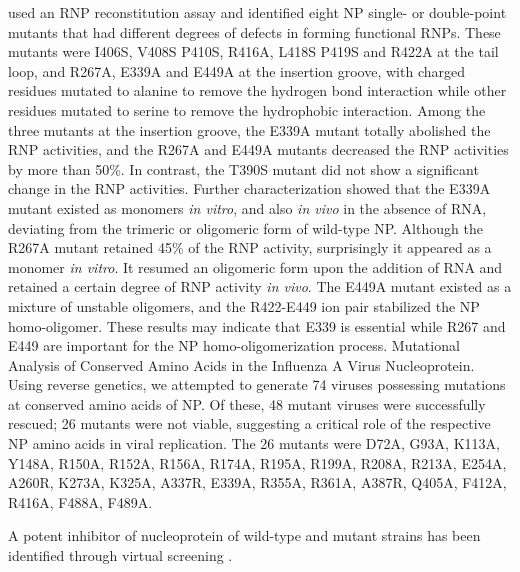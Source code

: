 \citep{1232} used an RNP reconstitution assay and identified eight NP single- or double-point mutants that had different degrees of defects in forming functional RNPs. These mutants were I406S, V408S P410S, R416A, L418S P419S and R422A at the tail loop, and R267A, E339A and E449A at the insertion groove, with charged residues mutated to alanine to remove the hydrogen bond interaction while other residues mutated to serine to remove the hydrophobic interaction. Among the three mutants at the insertion groove, the E339A mutant totally abolished the RNP activities, and the R267A and E449A mutants decreased the RNP activities by more than 50\%. In contrast, the T390S mutant did not show a significant change in the RNP activities. Further characterization showed that the E339A mutant existed as monomers \textit{in vitro}, and also \textit{in vivo} in the absence of RNA, deviating from the trimeric or oligomeric form of wild-type NP. Although the R267A mutant retained 45\% of the RNP activity, surprisingly it appeared as a monomer \textit{in vitro}. It resumed an oligomeric form upon the addition of RNA and retained a certain degree of RNP activity \textit{in vivo}. The E449A mutant existed as a mixture of unstable oligomers, and the R422-E449 ion pair stabilized the NP homo-oligomer. These results may indicate that E339 is essential while R267 and E449 are important for the NP homo-oligomerization process.
\citep{1561} Mutational Analysis of Conserved Amino Acids in the Influenza A Virus Nucleoprotein. Using reverse genetics, we attempted to generate 74 viruses possessing mutations at conserved amino acids of NP. Of these, 48 mutant viruses were successfully rescued; 26 mutants were not viable, suggesting a critical role of the respective NP amino acids in viral replication. The 26 mutants were D72A, G93A, K113A, Y148A, R150A, R152A, R156A, R174A, R195A, R199A, R208A, R213A, E254A, A260R, K273A, K325A, A337R, E339A, R355A, R361A, A387R, Q405A, F412A, R416A, F488A, F489A.

A potent inhibitor of nucleoprotein of wild-type and mutant strains has been identified through virtual screening \citep{1233}.

